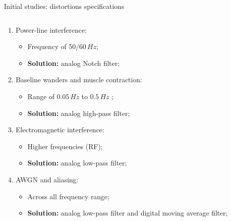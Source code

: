 \begin{frame}{Initial studies: distortions specifications}
\begin{minipage}[c][0.5\textheight][c]{\linewidth}
  \begin{columns}[onlytextwidth]
    \begin{column}{\textwidth} 
        \begin{enumerate}
            \item Power-line interference:
            \begin{itemize}
                \item Frequency of $50/60 \, Hz$;
                \item \textbf{Solution:} analog Notch filter;
            \end{itemize}
            \item Baseline wanders and muscle contraction:
            \begin{itemize}
                \item Range of $0.05 \, Hz$ \cite{khandpur2019compendium, murugappan2014development} to $0.5 \, Hz$ \cite{sahin2020instrumentation};
                \item \textbf{Solution:} analog high-pass filter;
            \end{itemize}
            \item Electromagnetic interference:
            \begin{itemize}
                \item Higher frequencies (RF);
                \item \textbf{Solution:} analog low-pass filter;
            \end{itemize}
            \item AWGN and aliasing:
            \begin{itemize}
                \item Across all frequency range;
                \item \textbf{Solution:} analog low-pass filter and digital moving average filter;
            \end{itemize}
        \end{enumerate}
      \end{column}

  \end{columns}
  \end{minipage}
\end{frame}







